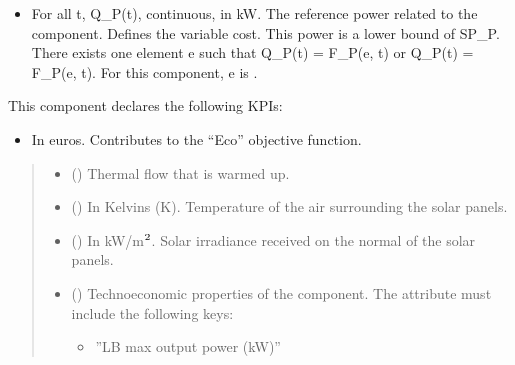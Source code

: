 \documentclass[letterpaper,10pt,english]{sphinxmanual}
\begin{document}
\begin{fulllineitems}
\begin{fulllineitems}
\begin{itemize}
\item {} 
\sphinxAtStartPar
For all t, Q\_P(t), continuous, in kW.
The reference power related to the component. Defines the variable cost.
This power is a lower bound of SP\_P.
There exists one element e such that Q\_P(t) = F\_P(e, t) or Q\_P(t) = \sphinxhyphen{} F\_P(e, t).
For this component, e is .

\end{itemize}

\sphinxAtStartPar
This component declares the following KPIs:
\begin{itemize}
\item {} 
\sphinxAtStartPar
{}
In euros.
Contributes to the “Eco” objective function.

\end{itemize}
\begin{quote}\begin{description}
\begin{itemize}
\item {} 
\sphinxAtStartPar
{} () \textendash{} Thermal flow that is warmed up.

\item {} 
\sphinxAtStartPar
{} (\sphinxstyleliteralemphasis{\sphinxupquote{, }}) \textendash{} In Kelvins (K).
Temperature of the air surrounding the solar panels.

\item {} 
\sphinxAtStartPar
{} (\sphinxstyleliteralemphasis{\sphinxupquote{, }}) \textendash{} In kW/m\(\sp{\text{2}}\).
Solar irradiance received on the normal of the solar panels.

\item {} 
\sphinxAtStartPar
{} (\sphinxstyleliteralemphasis{\sphinxupquote{ | }}) \textendash{} 
\sphinxAtStartPar
Techno\sphinxhyphen{}economic properties of the component.
The  attribute must include the following keys:
\begin{itemize}
\item {} 
\sphinxAtStartPar
”LB max output power (kW)”


\end{itemize}
\end{itemize}
\end{description}
\end{quote}
\end{fulllineitems}
\end{fulllineitems}
\end{document}
